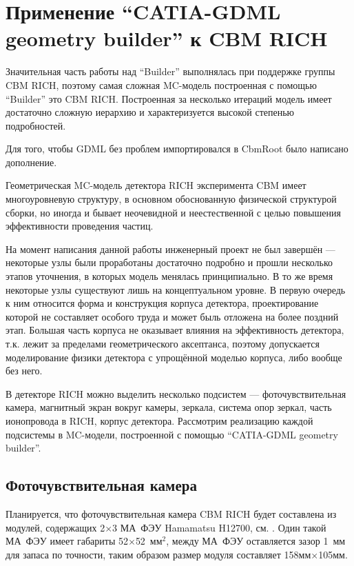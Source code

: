 \section{Применение ``CATIA-GDML geometry builder'' к CBM RICH}\label{sec:RICHgeo}

Значительная часть работы над ``Builder'' выполнялась при поддержке группы CBM RICH, поэтому самая сложная MC-модель построенная с помощью ``Builder'' это CBM RICH. Построенная за несколько итераций модель имеет достаточно сложную иерархию и характеризуется высокой степенью подробностей.

Для того, чтобы GDML без проблем импортировался в CbmRoot было написано дополнение.

Геометрическая MC-модель детектора RICH эксперимента CBM имеет многоуровневую структуру, в основном обоснованную физической структурой сборки, но иногда и \todo бывает неочевидной и неестественной с целью повышения эффективности проведения частиц.

На момент написания данной работы инженерный проект не был завершён --- некоторые узлы были проработаны достаточно подробно и прошли несколько этапов уточнения, в которых модель менялась принципиально. В то же время некоторые узлы существуют лишь на концептуальном уровне. В первую очередь к ним относится форма и конструкция корпуса детектора, проектирование которой не составляет особого труда и может быль отложена на более поздний этап. Большая часть корпуса не оказывает влияния на эффективность детектора, т.к. лежит за пределами геометрического аксептанса, поэтому допускается моделирование физики детектора с упрощённой моделью корпуса, либо вообще без него.

В детекторе RICH можно выделить несколько подсистем --- фоточувствительная камера, магнитный экран вокруг камеры, зеркала, система опор зеркал, часть ионопровода в RICH, корпус детектора. Рассмотрим реализацию каждой подсистемы в MC-модели, построенной с помощью ``CATIA-GDML geometry builder''.

\subsection{Фоточувствительная камера}\label{sec:RICHgeoCamera}

Планируется, что фоточувствительная камера CBM RICH будет составлена из модулей, содержащих 2$\times$3 МА~ФЭУ Hamamatsu H12700, см. . Один такой МА~ФЭУ имеет габариты 52$\times$52~мм$^2$, между МА~ФЭУ оставляется зазор 1~мм для запаса по точности, таким образом размер модуля составляет 158мм$\times$105мм.

